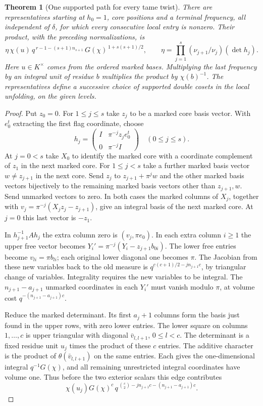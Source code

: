 \documentclass[a4paper,11pt]{article}
\newtheorem{theorem}[proposition]{Theorem}
\theoremstyle{definition}
\theoremstyle{remark}
\numberwithin{equation}{section}
\begin{document}
\begin{theorem}[One supported path for every tame twist]\leavevmode
\label{thm:splitpath322}
There are representatives starting at \(h_0=1\), core
positions and a terminal frequency, all independent of
\(\delta\), for which every consecutive local entry is
nonzero. Their product, with the preceding normalizations, is
\[
       \eta\,\chi(u)\,q^{\,r-1-(s+1)n_{s+1}}\,
                  G(\chi)^{\,1+s(s+1)/2},
 \qquad
 \eta=\prod_{j=1}^{s}(\nu_{j+1}/\nu_j)(\det h_j).
\]
Here \(u\in K^\times\) comes from the ordered marked bases.
Multiplying the last frequency by an integral unit of residue
\(b\) multiplies the product by \(\chi(b)^{-1}\).
The representatives define a successive choice of supported
double cosets in the local unfolding, on the given levels.
\end{theorem}
\begin{proof}
Put \(z_0=0\). For \(1\le j\le s\) take \(z_j\) to be a
marked core basis vector. With \(e_0^t\) extracting the
first flag coordinate, choose
\[
 h_j=
 \begin{pmatrix}
 I&\pi^{-j}z_j e_0^t\\0&\pi^{-j}I
 \end{pmatrix}\quad(0\le j\le s).
\]
At \(j=0<s\) take \(X_0\) to identify the marked core with
a coordinate complement of \(z_1\) in the next marked core.
For \(1\le j<s\) take a further marked basis vector
\(w\ne z_{j+1}\) in the next core.
Send \(z_j\) to \(z_{j+1}+\pi^jw\) and the other marked
basis vectors bijectively to the remaining marked basis
vectors other than \(z_{j+1},w\). Send unmarked vectors
to zero. In both cases the marked columns of \(X_j\),
together with \(v_j=\pi^{-j}(X_jz_j-z_{j+1})\), give an
integral basis of the next marked core. At \(j=0\) this last
vector is \(-z_1\).

In \(h_{j+1}^{-1}Ah_j\) the extra column zero is
\((v_j,\pi e_0)\). In each extra column \(i\ge1\) the
upper free vector becomes
\(Y_i'=\pi^{-j}(Y_i-z_{j+1}b_{0i})\). The lower free
entries become \(v_{li}=\pi b_{li}\); each original lower
diagonal one becomes \(\pi\). The Jacobian from these new
variables back to the old measure is
\(q^{c(c+1)/2-jn_{j+1}c}\), by triangular change of
variables. Integrality requires the new variables to be
integral. The \(n_{j+1}-a_{j+1}\) unmarked coordinates
in each \(Y_i'\) must vanish modulo \(\pi\), at volume cost
\(q^{-(n_{j+1}-a_{j+1})c}\).

Reduce the marked determinant. Its first \(a_j+1\) columns
form the basis just found in the upper rows, with zero lower
entries. The lower square on columns \(1,\ldots,c\) is upper
triangular with diagonal \(\bar v_{l,l+1}\), \(0\le l<c\).
The determinant is a fixed residue unit \(u_j\) times the
product of these \(c\) entries. The additive character
is the product of \(\theta(\bar v_{l,l+1})\) on the same
entries. Each gives the one-dimensional integral
\(q^{-1}G(\chi)\), and all remaining unrestricted integral
coordinates have volume one. Thus before the two exterior
scalars this edge contributes
\[
   \chi(u_j)G(\chi)^c\,
   q^{\,\binom{c}{2}-jn_{j+1}c-(n_{j+1}-a_{j+1})c}.
\]


\end{proof}
\end{document}
